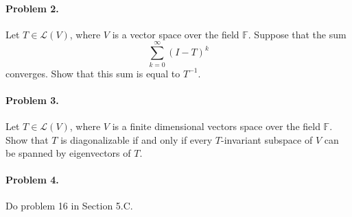 \documentclass{article}
\begin{document}
\paragraph*{Problem 2.}	Let $T\in\mathcal{L}(V)$, where $V$ is a vector space over the field $\mathbb{F}$. Suppose that the sum
\[
\sum_{k=0}^{\infty}(I-T)^{k}
\]
converges. Show that this sum is equal to $T^{-1}$. 

\paragraph*{Problem 3.}	Let $T\in\mathcal{L}(V)$, where $V$ is a finite dimensional vectors space over the field $\mathbb{F}$. Show that $T$ is diagonalizable if and only if every $T$-invariant subspace of $V$ can be spanned by eigenvectors of $T$. 

\paragraph*{Problem 4.}	Do problem 16 in Section 5.C. 
\end{document}
